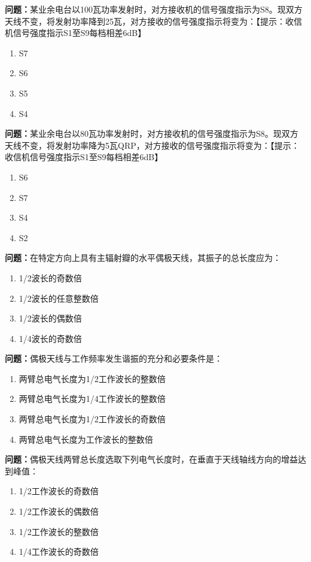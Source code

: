 \bigskip


\noindent\textbf{问题：}某业余电台以100瓦功率发射时，对方接收机的信号强度指示为S8。现双方天线不变，将发射功率降到25瓦，对方接收的信号强度指示将变为：【提示：收信机信号强度指示S1至S9每档相差6dB】
\begin{enumerate}[label=\Alph*), leftmargin=3em]
\item S7
\item S6
\item S5
\item S4
\end{enumerate}

\bigskip


\noindent\textbf{问题：}某业余电台以80瓦功率发射时，对方接收机的信号强度指示为S8。现双方天线不变，将发射功率降为5瓦QRP，对方接收的信号强度指示将变为：【提示：收信机信号强度指示S1至S9每档相差6dB】
\begin{enumerate}[label=\Alph*), leftmargin=3em]
\item S6
\item S7
\item S4
\item S2
\end{enumerate}

\bigskip


\noindent\textbf{问题：}在特定方向上具有主辐射瓣的水平偶极天线，其振子的总长度应为：
\begin{enumerate}[label=\Alph*), leftmargin=3em]
\item 1/2波长的奇数倍
\item 1/2波长的任意整数倍
\item 1/2波长的偶数倍
\item 1/4波长的奇数倍
\end{enumerate}

\bigskip


\noindent\textbf{问题：}偶极天线与工作频率发生谐振的充分和必要条件是：
\begin{enumerate}[label=\Alph*), leftmargin=3em]
\item 两臂总电气长度为1/2工作波长的整数倍
\item 两臂总电气长度为1/4工作波长的整数倍
\item 两臂总电气长度为1/2工作波长的奇数倍
\item 两臂总电气长度为工作波长的整数倍
\end{enumerate}

\bigskip


\noindent\textbf{问题：}偶极天线两臂总长度选取下列电气长度时，在垂直于天线轴线方向的增益达到峰值：
\begin{enumerate}[label=\Alph*), leftmargin=3em]
\item 1/2工作波长的奇数倍
\item 1/2工作波长的偶数倍
\item 1/2工作波长的整数倍
\item 1/4工作波长的奇数倍
\end{enumerate}


